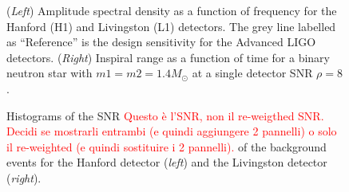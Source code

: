 \documentclass[binding=0.6cm, LaM]{sapthesis}
\newcommand{\fpg}[1]{\textcolor{red}{#1} }
\begin{document}
        \begin{figure}[!t]
          \noindent
          \label{asd}
          \centering
          \caption{(\textit{Left}) Amplitude spectral density as a function of frequency for the Hanford (H1) and Livingston (L1) detectors. The grey line labelled as ``Reference'' is the design sensitivity for the Advanced LIGO detectors. (\textit{Right}) Inspiral range as a function of time for a binary neutron star with $m1 = m2 = 1.4 M_\odot$ at a single detector SNR $\rho = 8$.}
          \label{fig:asd}
        \end{figure}
        \begin{figure}[!t]
          \noindent
          \label{snrhistogram}
          \centering
          \caption{Histograms of the SNR \fpg{Questo \`e l'SNR, non il re-weigthed SNR.  Decidi se mostrarli entrambi (e quindi aggiungere 2 pannelli) o solo il re-weighted (e quindi sostituire i 2 pannelli).} of the background events for the Hanford detector (\textit{left}) and the Livingston detector (\textit{right}).}
          \label{fig:snrhistogram}
        \end{figure}
\end{document}
